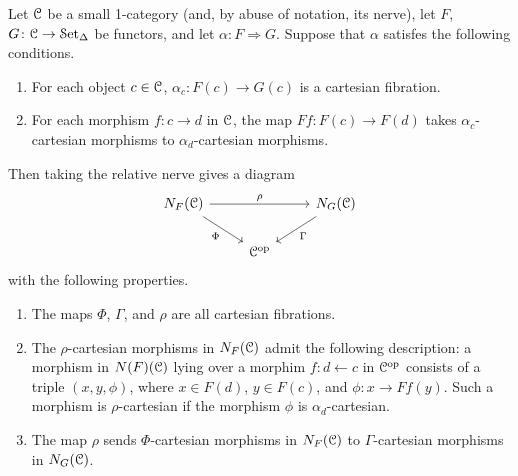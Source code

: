 \documentclass[main.tex]{subfiles}
\begin{document}
\begin{lemma}
  \label{lemma:triangle_of_cartesian_fibrations}
  Let $\mathcal{C}$ be a small 1-category (and, by abuse of notation, its nerve), let $F$, $G\colon \mathcal{C} \to \mathcal{S}\mathrm{et}_{\Delta}$ be functors, and let $\alpha\colon F \Rightarrow G$. Suppose that $\alpha$ satisfes the following conditions.
  \begin{enumerate}
    \item For each object $c \in \mathcal{C}$, $\alpha_{c}\colon F(c) \to G(c)$ is a cartesian fibration.

    \item For each morphism $f\colon c \to d$ in $\mathcal{C}$, the map $Ff\colon F(c) \to F(d)$ takes $\alpha_{c}$-cartesian morphisms to $\alpha_{d}$-cartesian morphisms.
  \end{enumerate}
  Then taking the relative nerve gives a diagram
  \begin{equation*}
    \begin{tikzcd}
      N_{F}(\category{C})
      \arrow[rr, "\rho"]
      \arrow[dr, swap, "\Phi"]
      &&
      N_{G}(\category{C})
      \arrow[dl, "\Gamma"]
      \\
      & \category{C}\op
    \end{tikzcd}
  \end{equation*}
  with the following properties.
  \begin{enumerate}
    \item The maps $\Phi$, $\Gamma$, and $\rho$ are all cartesian fibrations.

    \item The $\rho$-cartesian morphisms in $N_{F}(\mathcal{C})$ admit the following description: a morphism in $N(F)(\mathcal{C})$ lying over a morphim $f\colon d \leftarrow c$ in $\mathcal{C}^{\mathrm{op}}$ consists of a triple $(x, y, \phi)$, where $x \in F(d)$, $y \in F(c)$, and $\phi\colon x \to Ff(y)$. Such a morphism is $\rho$-cartesian if the morphism $\phi$ is $\alpha_{d}$-cartesian.

    \item The map $\rho$ sends $\Phi$-cartesian morphisms in $N_{F}(\mathcal{C})$ to $\Gamma$-cartesian morphisms in $N_{G}(\mathcal{C})$.
  \end{enumerate}
\end{lemma}
\end{document}
